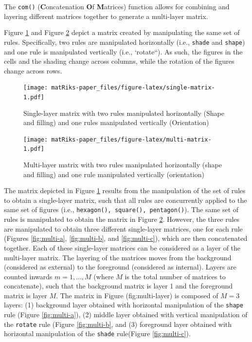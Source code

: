 The \texttt{com()} (\textbf{C}oncatenation \textbf{O}f \textbf{M}atrices) function allows for combining and layering different matrices together to generate a multi-layer matrix.

Figure \ref{fig:single-matrix} and Figure \ref{fig:multi-matrix} depict a matrix created by manipulating the same set of rules.
Specifically, two rules are manipulated horizontally (i.e., \texttt{shade} and \texttt{shape}) and one rule is manipulated vertically (i.e., `rotate``).
As such, the figures in the cells and the shading change across columns, while the rotation of the figures change across rows.

\begin{figure}
\centering
\texttt{[image: matRiks-paper\_files/figure-latex/single-matrix-1.pdf]}
\caption{\label{fig:single-matrix}Single-layer matrix with two rules manipulated horizontally (Shape and filling) and one rules manipulated vertically (Orientation)}
\end{figure}

\begin{figure}
\centering
\texttt{[image: matRiks-paper\_files/figure-latex/multi-matrix-1.pdf]}
\caption{\label{fig:multi-matrix}Multi-layer matrix with two rules manipulated horizontally (shape and filling) and one rule manipulated vertically (orientation)}
\end{figure}

The matrix depicted in Figure \ref{fig:single-matrix} results from the manipulation of the set of rules to obtain a single-layer matrix, such that all rules are concurrently applied to the same set of figures (i.e., \texttt{hexagon(),\ square(),\ pentagon()}).
The same set of rules is manipulated to obtain the matrix in Figure \ref{fig:multi-matrix}.
However, the three rules are manipulated to obtain three different single-layer matrices, one for each rule (Figures \ref{fig:multi-a}, \ref{fig:multi-b}, and \ref{fig:multi-c}), which are then concatenated together.
Each of these single-layer matrices can be considered as a layer of the multi-layer matrix.
The layering of the matrices moves from the background (considered as external) to the foreground (considered as internal).
Layers are counted inwards \(m = 1, \ldots, M\) (where \(M\) is the total number of matrices to concatenate), such that the background matrix is layer 1 and the foreground matrix is layer \(M\).
The matrix in Figure (fig:multi-layer) is composed of \(M = 3\) layers: (1) background layer obtained with horizontal manipulation of the \texttt{shape} rule (Figure \ref{fig:multi-a}), (2) middle layer obtained with vertical manipulation of the \texttt{rotate} rule (Figure \ref{fig:multi-b}, and (3) foreground layer obtained with horizontal manipulation of the \texttt{shade} rule(Figure \ref{fig:multi-c}).


